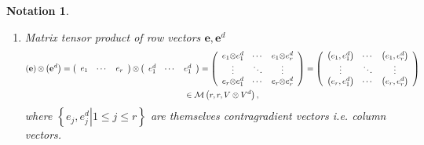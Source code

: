 \documentclass[aps,preprint]{revtex4}%
\newtheorem{notation}[theorem]{Notation}
\begin{document}
\begin{notation}
\begin{enumerate}
\item Matrix tensor product of row vectors $\mathbf{e,e}^{d}$
\begin{gather}
\left(  \mathbf{e}\right)  \mathbf{\otimes}\left(  \mathbf{e}^{d}\right)
=\left(
\begin{array}
[c]{ccc}%
e_{1} & \cdots & e_{r}%
\end{array}
\right)  \mathbf{\otimes}\left(
\begin{array}
[c]{ccc}%
e_{1}^{d} & \cdots & e_{1}^{d}%
\end{array}
\right)  =\left(
\begin{array}
[c]{ccc}%
e_{1}\mathbf{\otimes}e_{1}^{d} & \cdots & e_{1}\mathbf{\otimes}e_{r}^{d}\\
\vdots & \ddots & \vdots\\
e_{r}\mathbf{\otimes}e_{1}^{d} & \cdots & e_{r}\mathbf{\otimes}e_{r}^{d}%
\end{array}
\right)  =\left(
\begin{array}
[c]{ccc}%
\left(  e_{1},e_{1}^{d}\right)  & \cdots & \left(  e_{1},e_{r}^{d}\right) \\
\vdots & \ddots & \vdots\\
\left(  e_{r},e_{1}^{d}\right)  & \cdots & \left(  e_{r},e_{r}^{d}\right)
\end{array}
\right) \\
\in\mathcal{M}\left(  r,r,V\otimes V^{d}\right)  ,
\end{gather}
where $\left\{  \left.  e_{j},e_{j}^{d}\right\vert 1\leq j\leq r\right\}  $
are themselves contragradient vectors i.e. column vectors.


\end{enumerate}
\end{notation}
\end{document}
